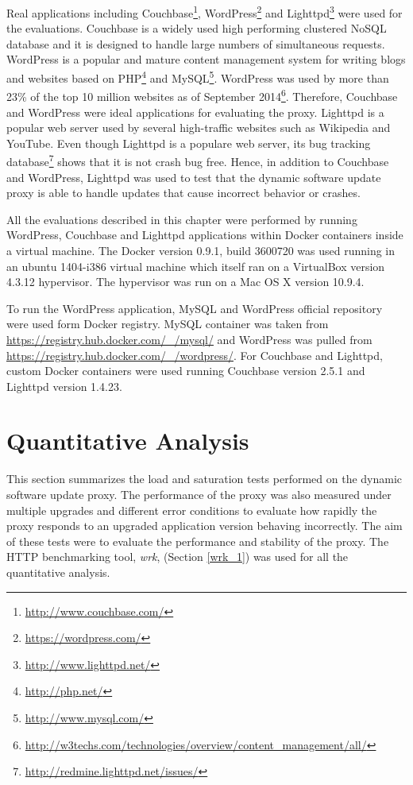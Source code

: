 \documentclass[a4paper,11pt,twoside]{report}
\begin{document}
Real applications including Couchbase\footnote{\label{couchbase} \url{http://www.couchbase.com/}}, WordPress\footnote{\label{wordpress} \url{https://wordpress.com/}} and Lighttpd\footnote{\label{lighttpd}\url{http://www.lighttpd.net/}} were used for the evaluations. Couchbase is a widely used high performing clustered NoSQL database and it is designed to handle large numbers of  simultaneous requests. WordPress is a popular and mature content management system for writing blogs and websites based on PHP\footnote{\label{PHP}\url{http://php.net/}} and MySQL\footnote{\label{MySQL}\url{http://www.mysql.com/}}. WordPress was used by more than 23\% of the top 10 million websites as of September 2014\footnote{\label{w3techs}\url{http://w3techs.com/technologies/overview/content_management/all/}}. Therefore, Couchbase and WordPress were ideal applications for evaluating the proxy. Lighttpd is a popular web server used by several high-traffic websites such as Wikipedia and YouTube. Even though Lighttpd is a populare web server, its bug tracking database\footnote{\label{redmine}\url{http://redmine.lighttpd.net/issues/}} shows that it is not crash bug free. Hence, in addition to Couchbase and WordPress,  Lighttpd was used to test that the dynamic software update proxy is able to handle updates that cause incorrect behavior or crashes.

All the evaluations described in this chapter were performed by running WordPress, Couchbase and Lighttpd applications within Docker containers inside a virtual machine. The Docker version 0.9.1, build 3600720 was used running in an ubuntu 1404-i386 virtual machine which itself ran on a VirtualBox version 4.3.12 hypervisor. The hypervisor was run on a Mac OS X version 10.9.4.

To run the WordPress application, MySQL and WordPress official repository were used form Docker registry. MySQL container was taken from \url{https://registry.hub.docker.com/_/mysql/} and WordPress was pulled from \url{https://registry.hub.docker.com/_/wordpress/}. For Couchbase and Lighttpd, custom Docker containers were used running Couchbase version 2.5.1 and Lighttpd version 1.4.23.              

\section{Quantitative Analysis}
This section summarizes the load and saturation tests performed on the dynamic software update proxy. The performance of the proxy was also measured under multiple upgrades and different error conditions to evaluate how rapidly the proxy responds to an upgraded application version behaving incorrectly. The aim of these tests were to evaluate the performance and stability of the proxy. The HTTP benchmarking tool, \textit{wrk}, (Section \ref{wrk_1}) was used for all the quantitative analysis.
\end{document}
